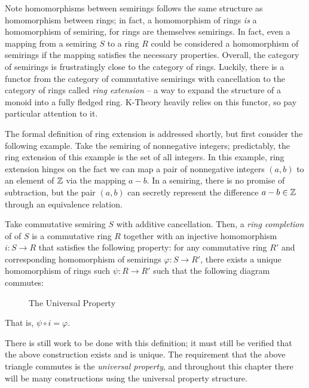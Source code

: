 \documentclass[../sean_thesis.tex]{subfiles}
\begin{document}
	Note homomorphisms between semirings follows the same structure as homomorphism between rings; in fact, a homomorphism of rings \emph{is} a homomorphism of semiring, for rings are themselves semirings. In fact, even a mapping from a semiring $S$ to a ring $R$ could be considered a homomorphism of semirings if the mapping satisfies the necessary properties. Overall, the category of semirings is frustratingly close to the category of rings. Luckily, there is a functor from the category of commutative semirings with cancellation to the category of rings  called \emph{ring extension} -- a way to expand the structure of a monoid into a fully fledged ring. K-Theory heavily relies on this functor, so pay particular attention to it.
	
	 The formal definition of ring extension is addressed shortly, but first consider the following example. Take the semiring of nonnegative integers; predictably, the ring extension of this example is the set of all integers. In this example, ring extension hinges on the fact we can map a pair of nonnegative integers $(a,b)$ to an element of $\mathbb{Z}$ via the mapping $a-b$. In a semiring, there is no promise of subtraction, but the pair $(a,b)$ can secretly represent the difference $a-b \in \mathbb{Z}$ through an equivalence relation. 
	 	
\begin{definition}
	\label{def:group_completion}
	Take commutative semiring $S$ with additive cancellation. Then, a \emph{ring completion} of of $S$ is a commutative ring $R$ together with an injective homomorphism $i: S \to R$ that satisfies the following property: for any commutative ring $R'$ and corresponding homomorphism of semirings $\varphi: S \to R'$, there exists a unique homomorphism of rings such $\psi: R \to R'$ such that the following diagram commutes:
	
\begin{figure}[ht!]
	
	\caption{The Universal Property}
	\label{fig:universal_property}
\end{figure}

That is, $\psi \circ i = \varphi$.
\end{definition}
There is still work to be done with this definition; it must still be verified that the above construction exists and is unique. The requirement that the above triangle commutes is the \emph{universal property}, and throughout this chapter there will be many constructions using the universal property structure. 
\end{document}
